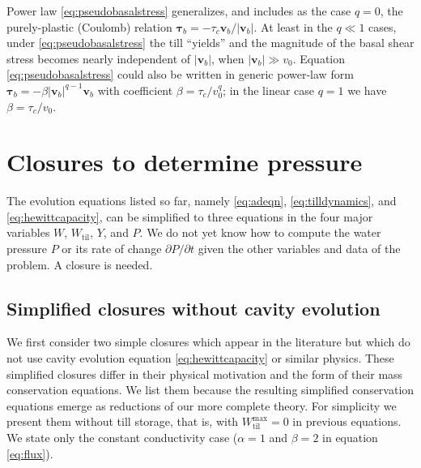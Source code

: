 \documentclass[gmd]{copernicus}   %
\newcommand{\text}{\textrm}
\newcommand{\Wtil}{W_{\text{til}}}
\newcommand{\Wtilmax}{W_{\text{til}}^{\text{max}}}
\begin{document}
Power law \eqref{eq:pseudobasalstress} generalizes, and includes as the case $q=0$, the purely-plastic (Coulomb) relation $\boldsymbol\tau_b = - \tau_c \mathbf{v}_b/|\mathbf{v}_b|$.  At least in the $q\ll 1$ cases, under \eqref{eq:pseudobasalstress} the till ``yields'' and the magnitude of the basal shear stress becomes nearly independent of $|\mathbf{v}_b|$, when $|\mathbf{v}_b| \gg v_0$.  Equation \eqref{eq:pseudobasalstress} could also be written in generic power-law form $\boldsymbol\tau_b = - \beta |\mathbf{v}_b|^{q-1} \mathbf{v}_b$ with coefficient $\beta = \tau_c / v_0^q$; in the linear case $q=1$ we have $\beta = \tau_c/v_0$.


\section{Closures to determine pressure} \label{sec:closures}

The evolution equations listed so far, namely \eqref{eq:adeqn}, \eqref{eq:tilldynamics}, and \eqref{eq:hewittcapacity}, can be simplified to three equations in the four major variables $W$, $\Wtil$, $Y$, and $P$.  We do not yet know how to compute the water pressure $P$ or its rate of change $\partial P/\partial t$ given the other variables and data of the problem.  A closure is needed.

\subsection{Simplified closures without cavity evolution}  We first consider two simple closures which appear in the literature but which do not use cavity evolution equation \eqref{eq:hewittcapacity} or similar physics.  These simplified closures differ in their physical motivation and the form of their mass conservation equations.  We list them because the resulting simplified conservation equations emerge as reductions of our more complete theory.  For simplicity we present them without till storage, that is, with $\Wtilmax=0$ in previous equations.  We state only the constant conductivity case ($\alpha=1$ and $\beta=2$ in equation \eqref{eq:flux}).
\end{document}
